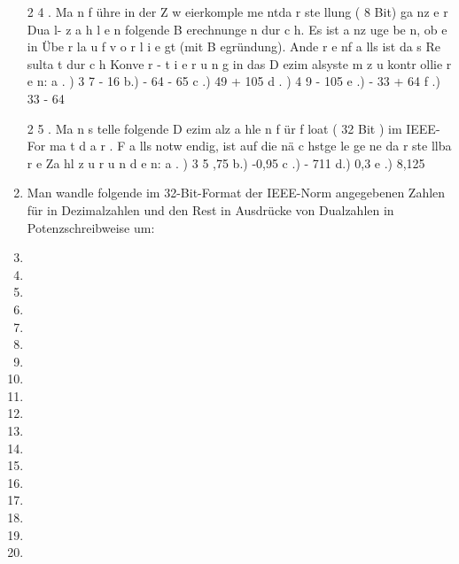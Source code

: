 \documentclass[12pt,a4paper]{scrreprt}
\begin{document}
\begin{enumerate}
2 4 . Ma n f ühre in der Z w eierkomple me ntda r ste llung ( 8 Bit) ga nz e r Dua l-
z a h l e n folgende B erechnunge n dur c h. Es ist a nz uge be n, ob e in Übe r la u f
v o r l i e gt (mit B egründung). Ande r e nf a lls ist da s Re sulta t dur c h Konve r -
t i e r u n g in das D ezim alsyste m z u kontr ollie r e n:
a . ) 3 7 - 16
b.) - 64 - 65
c .) 49 + 105
d . ) 4 9 - 105
e .) - 33 + 64
f .) 33 - 64

2 5 . Ma n s telle folgende D ezim alz a hle n f ür f loat ( 32 Bit ) im IEEE- For ma t
d a r . F a lls notw endig, ist auf die nä c hstge le ge ne da r ste llba r e Za hl z u
r u n d e n:
a . ) 3 5 ,75
b.) -0,95
c .) - 711
d.) 0,3 e .) 8,125

\item Man wandle folgende im 32-Bit-Format der IEEE-Norm angegebenen
Zahlen für in Dezimalzahlen und den Rest in Ausdrücke von Dualzahlen in Potenzschreibweise um:

\item 
\item 
\item 
\item 
\item 
\item 
\item 
\item 
\item 
\item 
\item 
\item 
\item 
\item 
\item 
\item 
\item 
\item 

\end{enumerate}
\end{document}
